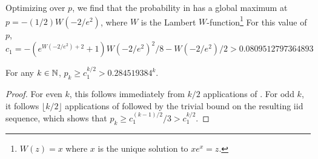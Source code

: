 \documentclass{patmorin}
\begin{document}
Optimizing over $p$, we find that the probability in
 has a global maximum at $p=-(1/2)W(-2/e^2)$,
where $W$ is the Lambert $W$-function\footnote{$W(z)=x$ where $x$ is
the unique solution to $xe^x = z$.} For this value of $p$,
\[
c_1 = -{\left(e^{{W}(-2/e^2) + 2} + 1\right)} {W}(-2/e^2)^{2}/8 - {W}(-2/e^2)/2
>
0.0809512797364893
\]

\begin{thm}
   For any $k\in\mathbb{N}$, $p_{k} \ge c_1^{k/2} > 0.284519384^k$.
\end{thm}

\begin{proof}
  For even $k$, this follows immediately from $k/2$ applications of
  . For odd $k$, it follows $\lfloor k/2\rfloor$
  applications of  followed by the trivial bound on
  the resulting iid sequence, which shows that $p_{k}\ge c_1^{(k-1)/2}/3
  > c_1^{k/2}$.
\end{proof}

%
%
%
%
%
%
%
\end{document}
